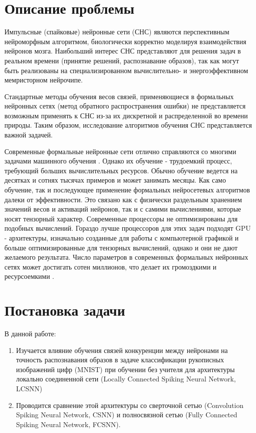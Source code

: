 \documentclass[a4paper]{article}
\begin{document}
\pagebreak

\tableofcontents

\section{Описание проблемы}
Импульсные (спайковые) нейронные сети (СНС) являются перспективным нейроморфным алгоритмом, биологически корректно моделируя взаимодействия нейронов мозга. Наибольший интерес СНС представляют для решения задач в реальном времени (принятие решений, распознавание образов), так как могут быть реализованы на специализированном вычислительно- и энергоэффективном мемристорном нейрочипе.

Стандартные методы обучения весов связей, применяющиеся в формальных нейронных сетях (метод обратного распространения ошибки) не представляется возможным применять к СНС из-за их дискретной и распределенной во времени природы. Таким образом, исследование алгоритмов обучения СНС представляется важной задачей.

Современные формальные нейронные сети отлично справляются со многими задачами машинного обучения \cite{pmlr-v28-wan13}. Однако их обучение - трудоемкий процесс, требующий больших вычислительных ресурсов. Обычно обучение ведется на десятках и сотнях тысячах примеров и может занимать месяцы. Как само обучение, так и последующее применение формальных нейросетевых алгоритмов далеки от эффективности. Это связано как с физически раздельным хранением значений весов и активаций нейронов, так и с самими вычислениями, которые носят тензорный характер. Современные процессоры не оптимизированы для подобных вычислений. Гораздо лучше процессоров для этих задач подходят GPU - архитектуры, изначально созданные для работы с компьютерной графикой и больше оптимизированные для тензорных вычислений, однако и они не дают желаемого результата. Число параметров в современных формальных нейронных сетях может достигать сотен миллионов, что делает их громоздкими и ресурсоемкими \cite{ManyParams}.

\section{Постановка задачи}
В данной работе:

\begin{enumerate}
 \item Изучается влияние обучения связей конкуренции \cite{MaxActiv1} \cite{MaxActiv2} между нейронами на точность распознавания образов в задаче классификации рукописных изображений цифр (MNIST) при обучении без учителя для архитектуры локально соединенной сети (Locally Connected Spiking Neural Network, LCSNN) \cite{saunders2019locally}
 
 \item Проводится сравнение этой архитектуры со сверточной сетью (Convolution Spiking Neural Network, CSNN) и полносвязной сетью (Fully Connected Spiking Neural Network, FCSNN).

\end{enumerate}
\end{document}
